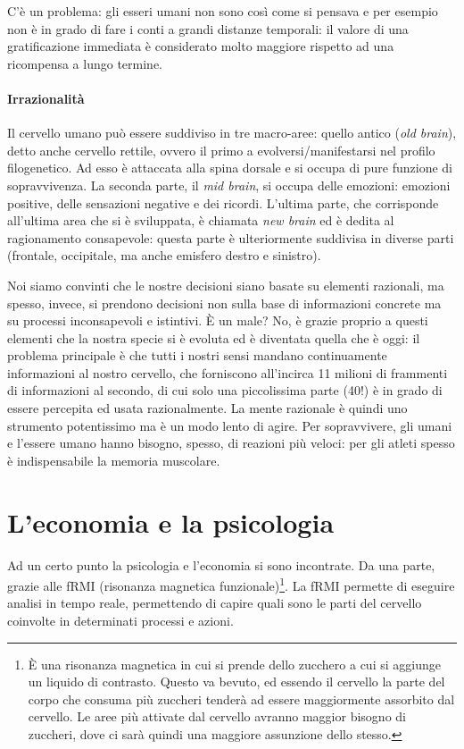 C'è un problema: gli esseri umani non sono così come si pensava e per esempio
non è in grado di fare i conti a grandi distanze temporali: il valore di una
gratificazione immediata è considerato molto maggiore rispetto ad una
ricompensa a lungo termine.

\paragraph*{Irrazionalità} 
Il cervello umano può essere suddiviso in tre macro-aree: quello
antico (\textit{old brain}), detto anche cervello rettile, ovvero il primo a
evolversi/manifestarsi nel profilo filogenetico. Ad esso è attaccata alla
spina dorsale e si occupa di pure funzione di sopravvivenza.
La seconda parte, il \textit{mid brain}, si occupa delle emozioni: emozioni
positive, delle sensazioni negative e dei ricordi.
L'ultima parte, che corrisponde all'ultima area che si è sviluppata, è chiamata
\textit{new brain} ed è dedita al ragionamento consapevole: questa parte è
ulteriormente suddivisa in diverse parti (frontale, occipitale, ma anche
emisfero destro e sinistro).

Noi siamo convinti che le nostre decisioni siano basate su elementi razionali,
ma spesso, invece, si prendono decisioni non sulla base di informazioni
concrete ma su processi inconsapevoli e istintivi.
È un male? No, è grazie proprio a questi elementi che la nostra specie si è
evoluta ed è diventata quella che è oggi: il problema principale è che tutti i
nostri sensi mandano continuamente informazioni al nostro cervello, che
forniscono all'incirca 11 milioni di frammenti di informazioni al secondo, di
cui solo una piccolissima parte (40!) è in grado di essere percepita ed usata
razionalmente. La mente razionale è quindi uno strumento potentissimo ma è un
modo lento di agire. Per sopravvivere, gli umani e l'essere umano hanno
bisogno, spesso, di reazioni più veloci: per gli atleti spesso è indispensabile
la memoria muscolare.

\section{L'economia e la psicologia}

Ad un certo punto la psicologia e l'economia si sono incontrate.
Da una parte, grazie alle fRMI (risonanza magnetica funzionale)\footnote{È una
risonanza magnetica in cui si prende dello zucchero a cui si aggiunge un
liquido di contrasto. Questo va bevuto, ed essendo il cervello la parte del
corpo che consuma più zuccheri tenderà ad essere maggiormente assorbito dal
cervello. Le aree più attivate dal cervello avranno maggior bisogno di
zuccheri, dove ci sarà quindi una maggiore assunzione dello stesso.}. La fRMI
permette di eseguire analisi in tempo reale, permettendo di capire quali sono
le parti del cervello coinvolte in determinati processi e azioni.

